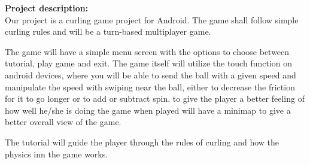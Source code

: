 \textbf{Project description:} \\ 
Our project is a curling game project for Android. The game shall follow simple curling rules and will be a turn-based multiplayer game.

The game will have a simple menu screen with the options to choose between tutorial, play game and exit. The game itself will utilize the touch function on android devices, where you will be able to send the ball with a given speed and manipulate the speed with swiping near the ball, either to decrease the friction for it to go longer or to add or subtract spin. to give the player a better feeling of how well he/she is doing the game when played will have a minimap to give a better overall view of the game. 

The tutorial will guide the player through the rules of curling and how the physics inn the game works.